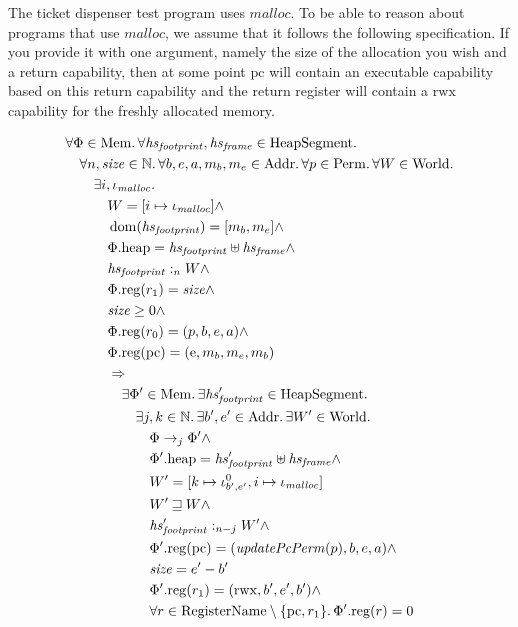 \documentclass[a4paper]{article}
\DeclareMathOperator{\dom}{dom}
\newcommand{\var}[1]{\mathit{#1}}
\newcommand{\pcreg}{\mathrm{pc}}
\newcommand{\heap}{\var{heap}}
\newcommand{\plainproj}[1]{\mathrm{#1}}
\newcommand{\memheap}[1][\Phi]{#1.\plainproj{heap}}
\newcommand{\memreg}[1][\Phi]{#1.\plainproj{reg}}
\newcommand{\plainfun}[2]{
  \ifthenelse{\equal{#2}{}}
             {\mathit{#1}}
             {\mathit{#1}(#2)}
}
\newcommand{\updatePcPerm}[1]{\plainfun{updatePcPerm}{#1}}
\newcommand{\future}{\mathbin{\sqsupseteq}}
\newcommand{\heapSat}[3][\heap]{#1 :_{#2} #3}
\newcommand{\codelabel}[1]{\mathit{#1}}
\newcommand{\malloc}{\codelabel{malloc}}
\newcommand{\plaindom}[1]{\mathrm{#1}}
\newcommand{\Addrs}{\plaindom{Addr}}
\newcommand{\Mems}{\plaindom{Mem}}
\newcommand{\RegName}{\plaindom{RegisterName}}
\newcommand{\HeapSegments}{\plaindom{HeapSegment}}
\newcommand{\nats}{\mathbb{N}}
\newcommand{\Perms}{\plaindom{Perm}}
\newcommand{\Worlds}{\plaindom{World}}
\newcommand{\plainperm}[1]{\mathrm{#1}}
\newcommand{\entry}{\plainperm{e}}
\newcommand{\rwx}{\plainperm{rwx}}
\newcommand{\step}[1][]{\rightarrow_{#1}}
\begin{document}
The ticket dispenser test program uses $\malloc$. To be able to reason about programs that use $\malloc$, we assume that it follows the following specification. If you provide it with one argument, namely the size of the allocation you wish and a return capability, then at some point $\pcreg$ will contain an executable capability based on this return capability and the return register will contain a $\rwx$ capability for the freshly allocated memory. 
\begin{specification}[Malloc v.2]
  \begin{align*}
    &\forall \Phi \in \Mems \ldotp \forall \hsfoot, \hsframe \in \HeapSegments \ldotp \\
    &\quad \forall n, \size \in \nats \ldotp \forall b,e,a,m_b,m_e \in \Addrs\ldotp\forall p \in \Perms \ldotp \forall W \in \Worlds \ldotp\\
    &\qquad \exists i, \iota_{\malloc} \ldotp \\
    &\qquad \quad W = [i \mapsto \iota_{\malloc}] \land \\
    &\qquad \quad \dom(\hsfoot) = [m_b,m_e] \land \\ %
    &\qquad \quad \memheap = \hsfoot \uplus \hsframe \land\\
    &\qquad \quad \heapSat[\hsfoot]{n}{W} \land \\
    &\qquad \quad \memreg(r_1) = \size \land \\
    &\qquad \quad \size \geq 0 \land \\
    &\qquad \quad \memreg(r_0) = (p,b,e,a) \land \\
    &\qquad \quad \memreg(\pcreg) = (\entry,m_b,m_e,m_b) \\ %
    &\qquad \quad \Rightarrow \\
    &\qquad \qquad\exists \Phi' \in \Mems \ldotp \exists \hsfoot' \in \HeapSegments\ldotp\\
    &\qquad \qquad \quad \exists j,k \in \nats \ldotp \exists b',e'\in \Addrs \ldotp \exists W' \in \Worlds \ldotp \\
    &\qquad \qquad \qquad \Phi \step[j]\Phi' \land \\
    &\qquad \qquad \qquad \memheap[\Phi']=\hsfoot' \uplus \hsframe \land\\
    &\qquad \qquad \qquad W' = [k \mapsto \iota_{b',e'}^0, i \mapsto \iota_{\malloc}]\\
    &\qquad \qquad \qquad W' \future W \land \\
    &\qquad \qquad \qquad \heapSat[\hsfoot']{n-j}{W'} \land \\
    &\qquad \qquad \qquad \memreg[\Phi'](\pcreg) = (\updatePcPerm{p},b,e,a) \land \\
    &\qquad \qquad \qquad \size = e'-b' \\
    &\qquad \qquad \qquad \memreg[\Phi'](r_1) = (\rwx,b',e',b') \land \\
    &\qquad \qquad \qquad \forall r \in \RegName \setminus \{\pcreg,r_1\} \ldotp \memreg[\Phi'](r) = 0
  \end{align*}
\end{specification}
\end{document}
